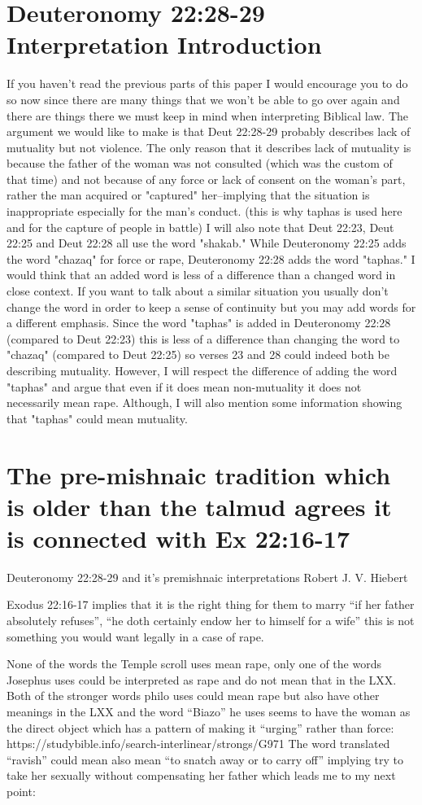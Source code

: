 \documentclass[11pt]{article}
\begin{document}
\section{Deuteronomy 22:28-29 Interpretation Introduction}
If you haven't read the previous parts of this paper I would encourage you to do so now since there are many things that we won't be able to go over again and there are things there we must keep in mind when interpreting Biblical law. The argument we would like to make is that Deut 22:28-29 probably describes lack of mutuality but not violence. The only reason that it describes lack of mutuality is because the father of the woman was not consulted (which was the custom of that time) and not because of any force or lack of consent on the woman's part, rather the man acquired or "captured" her--implying that the situation is inappropriate especially for the man's conduct. (this is why taphas is used here and for the capture of people in battle) I will also note that Deut 22:23, Deut 22:25 and Deut 22:28 all use the word "shakab." While Deuteronomy 22:25 adds the word "chazaq" for force or rape, Deuteronomy 22:28 adds the word "taphas." I would think that an added word is less of a difference than a changed word in close context. If you want to talk about a similar situation you usually don't change the word in order to keep a sense of continuity but you may add words for a different emphasis. Since the word "taphas" is added in Deuteronomy 22:28 (compared to Deut 22:23) this is less of a difference than changing the word to "chazaq" (compared to Deut 22:25) so verses 23 and 28 could indeed both be describing mutuality. However, I will respect the difference of adding the word "taphas" and argue that even if it does mean non-mutuality it does not necessarily mean rape. Although, I will also mention some information showing that "taphas" could mean mutuality.
\section{The pre-mishnaic tradition which is older than the talmud agrees it is connected with Ex 22:16-17}
Deuteronomy 22:28-29 and it's premishnaic interpretations
Robert J. V. Hiebert


Exodus 22:16-17 implies that it is the right thing for them to marry “if her father absolutely refuses”, “he doth certainly endow her to himself for a wife” this is not something you would want legally in a case of rape.



None of the words the Temple scroll uses mean rape, only one of the words Josephus uses could be interpreted as rape and do not mean that in the LXX. Both of the stronger words philo uses could mean rape but also have other meanings in the LXX and the word “Biazo” he uses seems to have the woman as the direct object which has a pattern of making it “urging” rather than force: https://studybible.info/search-interlinear/strongs/G971 The word translated “ravish” could mean also mean “to snatch away or to carry off” implying try to take her sexually without compensating her father which leads me to my next point:
\end{document}
